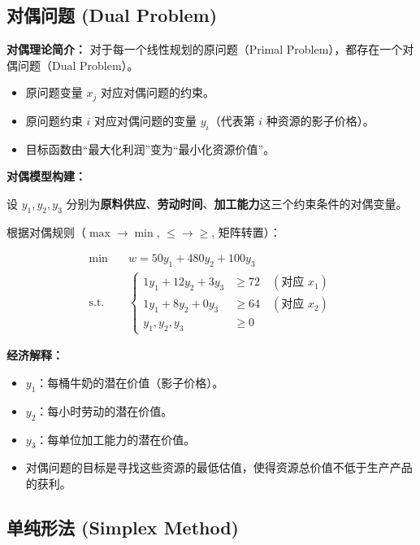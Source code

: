 \documentclass[a4paper,12pt]{ctexart} %
\begin{document}
	\subsection{对偶问题 (Dual Problem)}
	
	\textbf{对偶理论简介：}
	对于每一个线性规划的原问题（Primal Problem），都存在一个对偶问题（Dual Problem）。
	\begin{itemize}
		\item 原问题变量 $x_j$ 对应对偶问题的约束。
		\item 原问题约束 $i$ 对应对偶问题的变量 $y_i$（代表第 $i$ 种资源的影子价格）。
		\item 目标函数由“最大化利润”变为“最小化资源价值”。
	\end{itemize}
	
	\textbf{对偶模型构建：}
	
	设 $y_1, y_2, y_3$ 分别为\textbf{原料供应}、\textbf{劳动时间}、\textbf{加工能力}这三个约束条件的对偶变量。
	
	根据对偶规则（$\max \to \min$, $\leq \to \geq$, 矩阵转置）：
	
	\begin{equation}
		\begin{aligned}
			\min \quad & w = 50y_1 + 480y_2 + 100y_3 \\
			\text{s.t.} \quad & \left\{
			\begin{aligned}
				1y_1 + 12y_2 + 3y_3 & \geq 72 \quad (\text{对应 } x_1) \\
				1y_1 + 8y_2 + 0y_3 & \geq 64 \quad (\text{对应 } x_2) \\
				y_1, y_2, y_3 & \geq 0
			\end{aligned}
			\right.
		\end{aligned}
	\end{equation}
	
	\textbf{经济解释：}
	\begin{itemize}
		\item $y_1$：每桶牛奶的潜在价值（影子价格）。
		\item $y_2$：每小时劳动的潜在价值。
		\item $y_3$：每单位加工能力的潜在价值。
		\item 对偶问题的目标是寻找这些资源的最低估值，使得资源总价值不低于生产产品的获利。
	\end{itemize}
	
	\subsection{单纯形法 (Simplex Method)}
	
\end{document}
